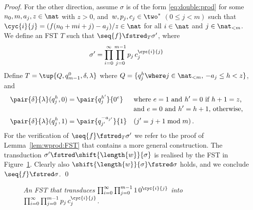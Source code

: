 \begin{proof}
  For the other direction, 
  assume $\sigma$ is of the form \eqref{eq:double:prod}
  for some $n_0,m,a_j,z \in \nat$ with $z > 0$, 
  and~$w, p_j, c_j \in \two^*$ $(0 \le j \lt m)$
  such that $\cyc{i}{j} = (f(n_0 + m i + j) - a_j)/z \in \nat$ for all $i \in \nat$ and $j \in \nat_{<m}$.
We define an FST $T$ such that $\seq{f} \fstred_{T} \sigma'$, where 
  \begin{align*}
    \sigma' = \prod_{i = 0}^{\infty} \prod_{j = 0}^{m-1} p_j \, c_j^{\cyc{i}{j}}
\end{align*}
  Define $T = \tup{Q,q_{m-1}^0,\delta,\lambda}$ 
  where $Q = \{q_j^h \where j \in \nat_{<m},\, {-}a_j \le h < z\}$,
  and 
  \begin{align*}
    \pair{\delta}{\lambda}(q_j^h,0) & = \pair{q_j^{h'}}{0^e} && 
    \text{where $e = 1$ and $h' = 0$ if $h + 1 = z$,} \\[-.5ex]
    &&&\text{and $e = 0$ and $h' = h + 1$, otherwise,} \\
\pair{\delta}{\lambda}(q_j^h,1) & = \pair{q_{j'}^{{-}a_{j'}}}{1} && (j' = j+1 \bmod{m}) \,.
  \end{align*}
  For the verification of $\seq{f} \fstred_{T} \sigma'$ 
  we refer to the proof of Lemma~\ref{lem:wprod:FST}
  that contains a more general construction.
  The transduction $\sigma' \fstred \shift{\length{w}}{\sigma}$ 
  is realised by the FST in Figure~\ref{fig:easy}.
  Clearly also $\shift{\length{w}}{\sigma} \fstred \sigma$ holds, and we conclude $\seq{f} \fstred \sigma$.
  \qed
\end{proof}

\begin{figure}[t]
  \begin{center}
  \end{center}
  \caption{\textit{An FST that transduces $\prod_{i = 0}^{\infty} \prod_{j = 0}^{m-1} 1 \, 0^{\cyc{i}{j}}$
      into $\prod_{i = 0}^{\infty} \prod_{j = 0}^{m-1} p_j \, c_j^{\cyc{i}{j}}$.}}
  \label{fig:easy}
\end{figure}





